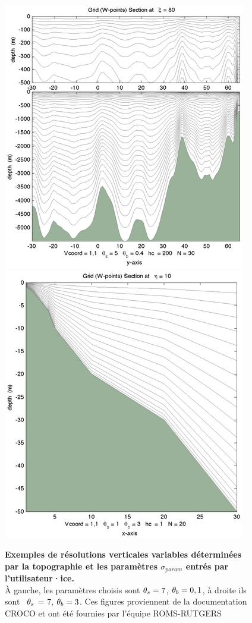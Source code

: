 \documentclass[10pt,a4paper,titlepage]{article}
\begin{document}
\begin{figure}[h!]
    \centering
    \includegraphics[scale=0.7]{../images/vcoord_ex1.png}
    \hspace{2cm}
    \includegraphics[scale=0.7]{../images/vcoord_ex5.png}
    \caption{\textbf{Exemples de résolutions verticales variables déterminées par la topographie et les paramètres  $\sigma_{param}$ entrés par l'utilisateur·ice.} \\
        À gauche, les paramètres choisis sont  $\protect\theta_s = 7$, $\protect\theta_b = 0,1$, à droite ils sont  $\protect\theta_s$ = 7, $\protect\theta_b = 3$.
        Ces figures proviennent de la documentation CROCO \cite{grid_doc} et ont été fournies par l'équipe ROMS-RUTGERS}
    \label{fig:vertical_resolution}
\end{figure}
\end{document}
